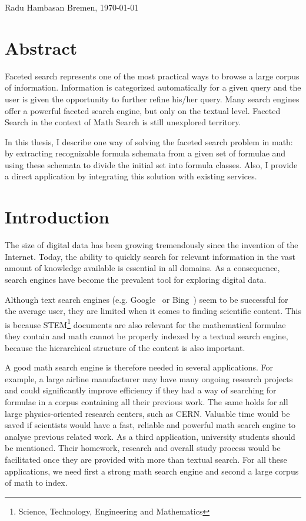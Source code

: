\documentclass[a4paper,oneside]{article}
\begin{document}
\vspace{20mm}

Radu Hambasan \hfill Bremen, \today

\newpage

\section*{Abstract}
Faceted search represents one of the most practical ways to browse a large
corpus of information. Information is categorized automatically for
a given query and the user is given the opportunity to further refine
his/her query. Many search engines offer a powerful faceted search engine,
but only on the textual level. Faceted Search in the context of Math Search
is still unexplored territory.

In this thesis, I describe one way of solving the faceted search problem in
math: by extracting recognizable formula schemata from a given set of formulae
and using these schemata to divide the initial set into formula classes. Also,
I provide a direct application by integrating this solution with existing
services.

\tableofcontents

\clearpage {}

\section{Introduction}\label{sec:intro}

The size of digital data has been growing tremendously since the invention
of the Internet. Today, the ability to quickly search for relevant information
in the vast amount of knowledge available is essential in all domains.
As a consequence, search engines have become the prevalent tool for exploring
digital data.

Although text search engines (e.g. Google~\cite{google:online} or
Bing~\cite{bing:online}) seem to be successful for the average user, they are
limited when it comes to finding scientific content. This is because
STEM\footnote{Science, Technology, Engineering and Mathematics} documents are
also relevant for the mathematical formulae they contain and math cannot be
properly indexed by a textual search engine, because the hierarchical structure
of the content is also important.

A good math search engine is therefore needed in several applications.
For example, a large airline manufacturer may have many ongoing research
projects and could significantly improve efficiency if they had a way of
searching for formulae in a corpus containing all their previous work. The same
holds for all large physics-oriented research centers, such as CERN. Valuable
time would be saved if scientists would have a fast, reliable and powerful math
search engine to analyse previous related work. As a third application,
university students should be mentioned. Their homework, research and overall
study process would be facilitated once they are provided with more than
textual search. For all these applications, we need first a strong math search
engine and second a large corpus of math to index.
\end{document}
